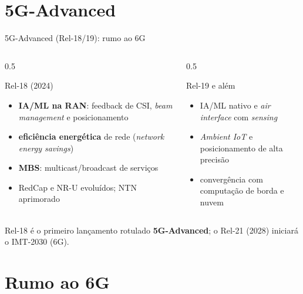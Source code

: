 \documentclass[aspectratio=169,11pt]{beamer}
\begin{document}
\section{5G-Advanced}

\begin{frame}{5G-Advanced (Rel-18/19): rumo ao 6G}
  \begin{columns}
    \begin{column}{0.5\textwidth}
      \begin{block}{Rel-18 (2024)}
        \begin{itemize}
          \item \textbf{IA/ML na RAN}: feedback de CSI, \emph{beam management} e posicionamento
          \item \textbf{eficiência energética} de rede (\emph{network energy savings})
          \item \textbf{MBS}: multicast/broadcast de serviços
          \item RedCap e NR-U evoluídos; NTN aprimorado
        \end{itemize}
      \end{block}
    \end{column}
    \begin{column}{0.5\textwidth}
      \begin{alertblock}{Rel-19 e além}
        \begin{itemize}
          \item IA/ML nativo e \emph{air interface} com \emph{sensing}
          \item \emph{Ambient IoT} e posicionamento de alta precisão
          \item convergência com computação de borda e nuvem
        \end{itemize}
      \end{alertblock}
    \end{column}
  \end{columns}
  \begin{center}
    {\scriptsize Rel-18 é o primeiro lançamento rotulado \textbf{5G-Advanced}; o Rel-21 (2028) iniciará o IMT-2030 (6G).}
  \end{center}
\end{frame}

\section{Rumo ao 6G}
\end{document}
